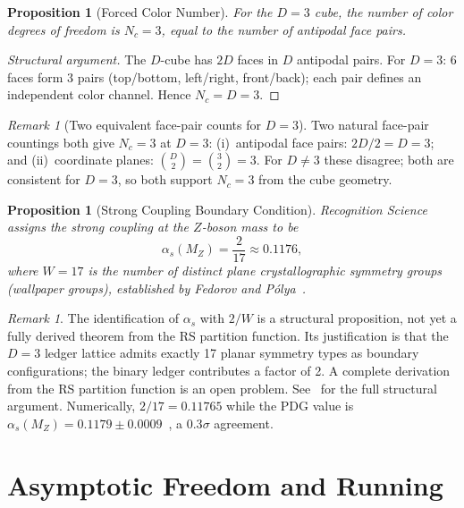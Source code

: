 \documentclass[12pt,a4paper]{article}
\newtheorem{proposition}[theorem]{Proposition}
\theoremstyle{definition}
\theoremstyle{remark}
\newtheorem{remark}[theorem]{Remark}
\begin{document}
\begin{proposition}[Forced Color Number]
\label{thm:nc}
For the $D = 3$ cube, the number of color degrees of freedom is
$N_c = 3$, equal to the number of antipodal face pairs.
\end{proposition}

\begin{proof}[Structural argument]
The $D$-cube has $2D$ faces in $D$ antipodal pairs.  For $D = 3$:
6 faces form 3 pairs (top/bottom, left/right, front/back); each pair
defines an independent color channel.  Hence $N_c = D = 3$.
\end{proof}

\begin{remark}[Two equivalent face-pair counts for $D=3$]
\label{rem:nc-count}
Two natural face-pair countings both give $N_c = 3$ at $D = 3$:
(i)~antipodal face pairs: $2D/2 = D = 3$; and
(ii)~coordinate planes: $\binom{D}{2} = \binom{3}{2} = 3$.
For $D \neq 3$ these disagree; both are consistent for $D = 3$,
so both support $N_c = 3$ from the cube geometry.
\end{remark}

\begin{proposition}[Strong Coupling Boundary Condition]
\label{prop:alphas}
Recognition Science assigns the strong coupling at the $Z$-boson mass
to be
\begin{equation}
  \alpha_s(M_Z) = \frac{2}{17} \approx 0.1176,
\end{equation}
where $W = 17$ is the number of distinct plane crystallographic
symmetry groups (wallpaper groups), established by Fedorov and
P\'olya~\cite{RS_Strong}.
\end{proposition}

\begin{remark}
The identification of $\alpha_s$ with $2/W$ is a structural
proposition, not yet a fully derived theorem from the RS
partition function.  Its justification is that the $D = 3$
ledger lattice admits exactly 17 planar symmetry types as
boundary configurations; the binary ledger contributes a factor
of 2.  A complete derivation from the RS partition function is an
open problem.  See~\cite{RS_Strong} for the full structural
argument.  Numerically, $2/17 = 0.11765$ while the PDG value is
$\alpha_s(M_Z) = 0.1179 \pm 0.0009$~\cite{PDG2024}, a $0.3\sigma$
agreement.
\end{remark}

\section{Asymptotic Freedom and Running}
\label{sec:running}
\end{document}
